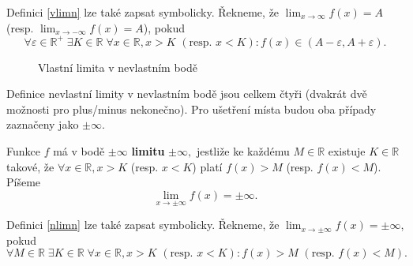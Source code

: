 \begin{pozn}
Definici \ref{vlimn} lze také zapsat symbolicky. Řekneme, že
$\lim_{x\to \infty} f(x) =A$ (resp. $\lim_{x\to -\infty} f(x) =A$), pokud
$$
\forall \varepsilon \in \mathbb R^+\;
    \exists K \in \mathbb R\; \forall x \in \mathbb R, x > K \,\, (\textrm{resp. } x< K)\colon
    f(x) \in \left ( A-\varepsilon, A+\varepsilon \right ).
$$
\end{pozn}

\begin{figure}[ht!]
\centering
{}
\caption{Vlastní limita v nevlastním bodě}
\end{figure}

\begin{pozn}
    Definice nevlastní limity v nevlastním bodě jsou celkem čtyři (dvakrát
    dvě možnosti pro plus/minus nekonečno).
    Pro ušetření místa budou oba případy zaznačeny jako $\pm \infty$.
\end{pozn}

\begin{definition}\label{nlimn}
    Funkce $f$ má v bodě $\pm \infty$ \textbf{limitu} $\pm \infty,$
    jestliže ke každému $M \in \mathbb R$ existuje
    $K \in \mathbb R$ takové, že $\forall x \in
    \mathbb R, x> K $ (resp. $x<K$) platí $f(x)>M$ (resp. $f(x) <M$). Píšeme
    $$\lim_{x\to \pm\infty}f(x)=\pm \infty.$$
\end{definition}

\begin{pozn}
    Definici \ref{nlimn} lze také zapsat symbolicky. Řekneme, že
    $\lim_{x\to \pm\infty} f(x) =\pm\infty$, pokud
    $$
    \forall M \in \mathbb R\;
        \exists K \in \mathbb R\; \forall x \in \mathbb R, x>K \,\, (\textrm{resp. }x<K)\colon
        f(x) > M \,\, (\textrm{resp. } f(x)<M).
    $$
\end{pozn}

